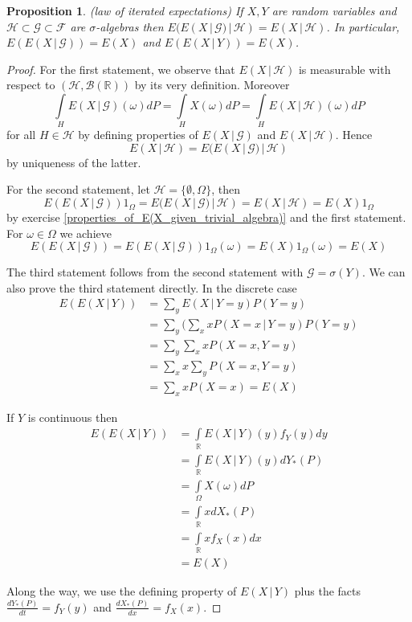 \documentclass[12pt]{amsart}
\newtheorem{proposition}[theorem]{Proposition}
\theoremstyle{definition}
\begin{document}
\begin{proposition} \label{iterated_expectation} (law of iterated expectations) If $X, Y$ are random variables and $\mathcal{H} \subset \mathcal{G} \subset \mathcal{F}$ are $\sigma$-algebras then $E(E(X \,|\, \mathcal{G}) \,|\, \mathcal{H}) = E(X \,|\, \mathcal{H})$. In particular, $E(E(X \,|\, \mathcal{G})) = E(X)$ and $E(E(X \,|\, Y)) = E(X)$.
\end{proposition}
\begin{proof} For the first statement, we observe that $E(X \,|\, \mathcal{H})$ is measurable with respect to $(\mathcal{H}, \mathcal{B}(\mathbb{R}))$ by its very definition. Moreover
$$\int\limits_H E(X \,|\, \mathcal{G})(\omega) dP = \int\limits_H X(\omega) dP = \int\limits_H E(X \,|\, \mathcal{H})(\omega) dP$$
for all $H \in \mathcal{H}$ by defining properties of $E(X \,|\, \mathcal{G})$ and $E(X \,|\, \mathcal{H})$. Hence
$$E(X \,|\, \mathcal{H}) = E(E(X \,|\, \mathcal{G}) \,|\, \mathcal{H})$$
by uniqueness of the latter.

For the second statement, let $\mathcal{H} = \{\emptyset, \Omega\}$, then
$$E(E(X \,|\, \mathcal{G}))1_{\Omega} = E(E(X \,|\, \mathcal{G}) \,|\, \mathcal{H}) = E(X \,|\, \mathcal{H}) = E(X)1_{\Omega}$$
by exercise \ref{properties_of_E(X_given_trivial_algebra)} and the first statement. For $\omega \in \Omega$ we achieve
$$E(E(X \,|\, \mathcal{G})) = E(E(X \,|\, \mathcal{G}))1_{\Omega}(\omega) = E(X)1_{\Omega}(\omega) = E(X)$$

The third statement follows from the second statement with $\mathcal{G} = \sigma(Y)$. We can also prove the third statement directly. In the discrete case
\begin{align*}
E(E(X \,|\, Y)) & = \sum\limits_yE(X \,|\, Y = y)P(Y = y) \\
 & = \sum\limits_y( \sum\limits_x xP(X = x \,|\, Y= y) P(Y = y) \\
 & = \sum\limits_y \sum\limits_x x P(X = x, Y = y) \\
 & = \sum\limits_x x \sum\limits_y P(X = x, Y= y) \\
 & = \sum\limits_x x P(X = x) = E(X)
\end{align*}

If $Y$ is continuous then
\begin{align*}
E(E(X \,|\, Y)) & = \int\limits_{\mathbb{R}} E(X \,|\, Y)(y) f_Y(y)dy \\
 & = \int\limits_{\mathbb{R}} E(X \,|\, Y)(y) dY_*(P) \\
 & = \int\limits_{\Omega} X(\omega)dP \\
 & = \int\limits_{\mathbb{R}} x dX_*(P) \\
 & = \int\limits_{\mathbb{R}} x f_X(x)dx \\
 & = E(X)
\end{align*}

Along the way, we use the defining property of $E(X \,|\, Y)$ plus the facts $\frac{dY_*(P)}{dt} = f_Y(y)$ and $\frac{dX_*(P)}{dx} = f_X(x)$.
\end{proof}
\end{document}
